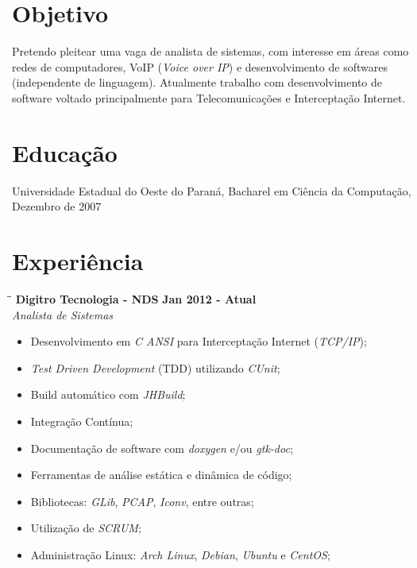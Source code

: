 \documentclass[margin]{res}
\begin{document}
  

\address{Florianopolis,  Brasil \\ benatto@gmail.com \\ +55 (48)99767365 }
                           
                        
\begin{resume}                        
 
\section{Objetivo}	Pretendo pleitear uma vaga de analista de sistemas, com interesse em áreas como redes de 
			computadores, VoIP (\textit{Voice over IP}) e desenvolvimento de softwares (independente de linguagem).
			Atualmente trabalho com desenvolvimento de software voltado principalmente para Telecomunicações e 
			Interceptação Internet.
 
\section{Educação}	Universidade Estadual do Oeste do Paraná, Bacharel em Ciência da Computação, Dezembro de 2007
  
\section{Experiência}      

\vspace{-0.1in}
   \begin{tabbing}
   \hspace{2.3in}\= \hspace{1.7in}\= \kill %
    \textbf{Digitro Tecnologia - NDS}    \>\>\textbf{Jan 2012 - Atual}\\
    \textit{Analista de Sistemas}                         
   \end{tabbing}\vspace{-20pt}      %
    \vspace{5mm}
    \begin{itemize}
     \item Desenvolvimento em \textit{C ANSI} para Interceptação Internet (\textit{TCP/IP});
     \item \textit{Test Driven Development} (TDD) utilizando \textit{CUnit};
     \item Build automático com \textit{JHBuild};
     \item Integração Contínua;
     \item Documentação de software com \textit{doxygen} e/ou \textit{gtk-doc};
     \item Ferramentas de análise estática e dinâmica de código;
     \item Bibliotecas: \textit{GLib}, \textit{PCAP}, \textit{Iconv}, entre outras; 
     \item Utilização de \textit{SCRUM}; 
     \item Administração Linux: \textit{Arch Linux}, \textit{Debian}, \textit{Ubuntu} e \textit{CentOS};
    \end{itemize}
 

\end{resume}
\end{document}
